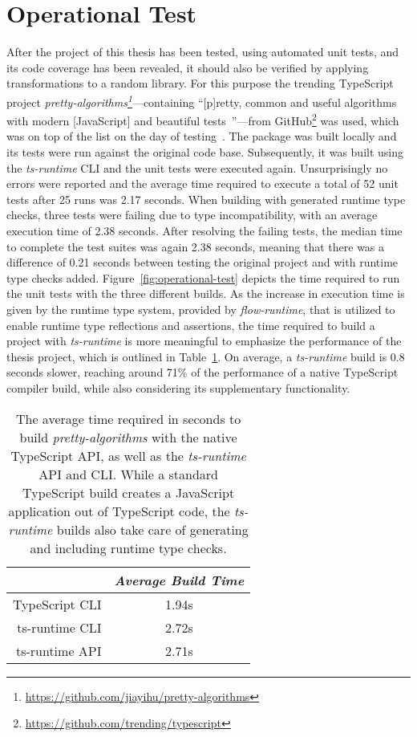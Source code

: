 \section{Operational Test}
\label{sec:operational-test}

After the project of this thesis has been tested, using automated unit tests, and its code coverage has been revealed, it should also be verified by applying transformations to a random library. For this purpose the trending TypeScript project \emph{pretty-algorithms\footnote{\url{https://github.com/jiayihu/pretty-algorithms}}}---containing ``[p]retty, common and useful algorithms with modern [JavaScript] and beautiful tests~\cite{Evaluation:pretty-algorithms}''---from GitHub\footnote{\url{https://github.com/trending/typescript}} was used, which was on top of the list on the day of testing~\cite{GitHub:Trending:Archive}. The package was built locally and its tests were run against the original code base. Subsequently, it was built using the \emph{ts-runtime} CLI and the unit tests were executed again. Unsurprisingly no errors were reported and the average time required to execute a total of 52 unit tests after 25 runs was 2.17 seconds. When building with generated runtime type checks, three tests were failing due to type incompatibility, with an average execution time of 2.38 seconds. After resolving the failing tests, the median time to complete the test suites was again 2.38 seconds, meaning that there was a difference of 0.21 seconds between testing the original project and with runtime type checks added. Figure~\ref{fig:operational-test} depicts the time required to run the unit tests with the three different builds. As the increase in execution time is given by the runtime type system, provided by \emph{flow-runtime}, that is utilized to enable runtime type reflections and assertions, the time required to build a project with \emph{ts-runtime} is more meaningful to emphasize the performance of the thesis project, which is outlined in Table~\ref{tab:build-time}. On average, a \emph{ts-runtime} build is 0.8 seconds slower, reaching around 71\% of the performance of a native TypeScript compiler build, while also considering its supplementary functionality. 
\begin{table}
\caption{The average time required in seconds to build \emph{pretty-algorithms} with the native TypeScript API, as well as the \emph{ts-runtime} API and CLI. While a standard TypeScript build creates a JavaScript application out of TypeScript code, the \emph{ts-runtime} builds also take care of generating and including runtime type checks.}
\label{tab:build-time}
\centering
\setlength{\tabcolsep}{5mm}
\def\arraystretch{1.25}
\small
\begin{tabular}{|r||c|}
    \hline
    & \emph{Average Build Time} \\
    \hline
    \hline
    TypeScript CLI & 1.94s \\
    \hline
    ts-runtime CLI & 2.72s \\
    \hline
    ts-runtime API & 2.71s \\
    \hline
  \end{tabular}
\end{table}
